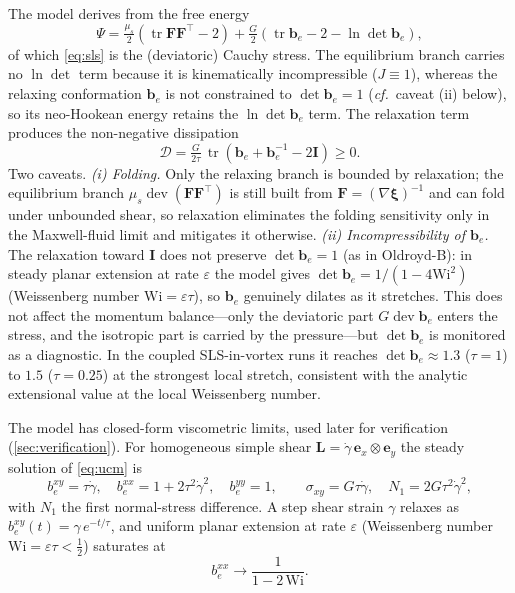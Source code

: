 \documentclass[final,3p,times]{elsarticle}
\theoremstyle{remark}
\newcommand{\xiv}{\bm{\xi}}              %
\newcommand{\Ften}{\bm{F}}              %
\newcommand{\be}{\bm{b}_e}              %
\newcommand{\Lt}{\bm{L}}                %
\newcommand{\It}{\bm{I}}                %
\newcommand{\grad}{\nabla}
\newcommand{\tr}{\operatorname{tr}}
\newcommand{\dev}{\operatorname{dev}}
\begin{document}
The model derives from the free energy
\begin{equation}
\Psi=\tfrac{\mu_s}{2}\!\left(\tr\Ften\Ften^{\!\top}-2\right)
      +\tfrac{G}{2}\!\left(\tr\be-2-\ln\det\be\right),
\label{eq:free-energy}
\end{equation}
of which \cref{eq:sls} is the (deviatoric) Cauchy stress. The equilibrium branch carries no
$\ln\det$ term because it is kinematically incompressible ($J\equiv1$), whereas the relaxing
conformation $\be$ is not constrained to $\det\be=1$ (\emph{cf.}\ caveat (ii) below), so its
neo-Hookean energy retains the $\ln\det\be$ term. The relaxation term produces
the non-negative dissipation
\begin{equation}
\mathcal D=\tfrac{G}{2\tau}\,\tr\!\left(\be+\be^{-1}-2\It\right)\ge0.
\label{eq:dissipation}
\end{equation}
Two caveats. \emph{(i) Folding.} Only the relaxing branch is bounded by
relaxation; the equilibrium branch $\mu_s\dev(\Ften\Ften^{\!\top})$ is still built from
$\Ften=(\grad\xiv)^{-1}$ and can fold under unbounded shear, so relaxation eliminates the
folding sensitivity only in the Maxwell-fluid limit and mitigates it otherwise.
\emph{(ii) Incompressibility of $\be$.} The relaxation toward $\It$ does not preserve
$\det\be=1$ (as in Oldroyd-B): in steady planar extension at rate $\varepsilon$ the model gives
$\det\be=1/(1-4\mathrm{Wi}^2)$ (Weissenberg number $\mathrm{Wi}=\varepsilon\tau$), so $\be$
genuinely dilates as it stretches. This does not affect
the momentum balance---only the deviatoric part $G\dev\be$ enters the stress, and the isotropic
part is carried by the pressure---but $\det\be$ is monitored as a diagnostic. In the coupled
SLS-in-vortex runs it reaches $\det\be\approx1.3$ ($\tau=1$) to $1.5$ ($\tau=0.25$) at the
strongest local stretch, consistent with the analytic extensional value at the local Weissenberg
number.

The model has closed-form viscometric limits, used later for verification
(\cref{sec:verification}). For homogeneous simple shear
$\Lt=\dot\gamma\,\bm e_x\!\otimes\!\bm e_y$ the steady solution of \cref{eq:ucm} is
\begin{equation}
b_e^{xy}=\tau\dot\gamma,\quad b_e^{xx}=1+2\tau^2\dot\gamma^2,\quad b_e^{yy}=1,
\qquad
\sigma_{xy}=G\tau\dot\gamma,\quad N_1=2G\tau^2\dot\gamma^2,
\label{eq:shear-limits}
\end{equation}
with $N_1$ the first normal-stress difference. A step shear strain $\gamma$ relaxes as
$b_e^{xy}(t)=\gamma\,e^{-t/\tau}$, and uniform planar extension at rate $\varepsilon$
(Weissenberg number $\mathrm{Wi}=\varepsilon\tau<\tfrac12$) saturates at
\begin{equation}
b_e^{xx}\to\frac{1}{1-2\,\mathrm{Wi}}.
\label{eq:ext-limit}
\end{equation}
\end{document}
